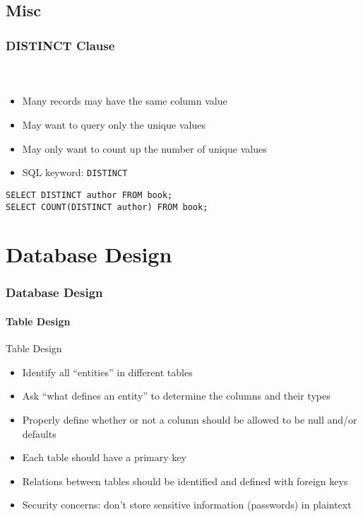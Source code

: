 \documentclass{beamer}
\begin{document}
\subsection{Misc}

\begin{frame}[fragile]
  \frametitle{DISTINCT Clause}
  \framesubtitle{~}

\begin{itemize}
  \item Many records may have the same column value
  \item May want to query only the unique values
  \item May only want to count up the number of unique values
  \item SQL keyword: \texttt{DISTINCT}
\end{itemize}

\begin{verbatim}
SELECT DISTINCT author FROM book;
SELECT COUNT(DISTINCT author) FROM book;
\end{verbatim}

\end{frame}

\section{Database Design}

\begin{frame}
  \frametitle{Database Design}
  \framesubtitle{Table Design}

  Table Design
  \begin{itemize}
    \item Identify all ``entities'' in different tables
    \item Ask ``what defines an entity'' to determine the columns and their types
    \item Properly define whether or not a column should be allowed to be null and/or defaults
    \item Each table should have a primary key
    \item Relations between tables should be identified and defined with foreign keys
    \item Security concerns: don't store sensitive information (passwords) in plaintext
  \end{itemize}

\end{frame}
\end{document}
